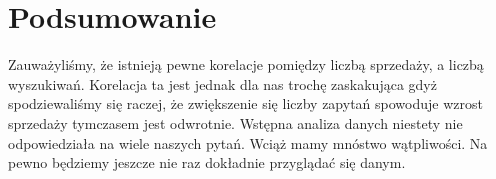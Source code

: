 \documentclass[a4paper,11pt]{article}
\begin{document}
\section{Podsumowanie}
Zauważyliśmy, że istnieją pewne korelacje pomiędzy liczbą sprzedaży, a liczbą wyszukiwań. Korelacja ta jest jednak dla nas trochę zaskakująca gdyż spodziewaliśmy się raczej, że zwiększenie się liczby zapytań spowoduje wzrost sprzedaży tymczasem jest odwrotnie. Wstępna analiza danych niestety nie odpowiedziała na wiele naszych pytań. Wciąż mamy mnóstwo wątpliwości. Na pewno będziemy jeszcze nie raz dokładnie przyglądać się danym.
\end{document}
